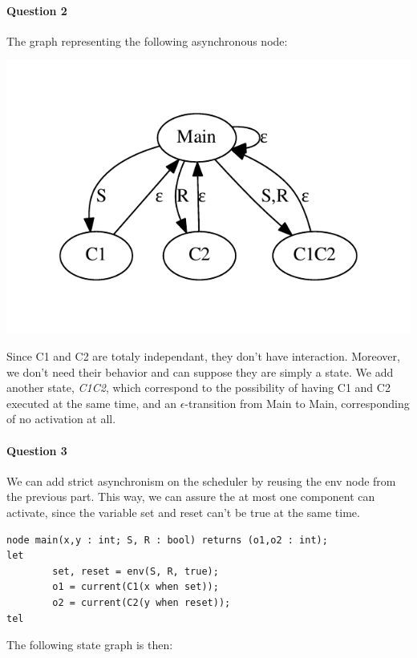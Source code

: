 \documentclass{article}
\begin{document}
\paragraph{Question 2}

The graph representing the following asynchronous node:

\begin{center}
\includegraphics{asyn_1.pdf}
\end{center}

Since C1 and C2 are totaly independant, they don't have interaction. Moreover,
we don't need their behavior and can suppose they are simply a state. We add
another state, \emph{C1C2}, which correspond to the possibility of having C1 and
C2 executed at the same time, and an $\epsilon$-transition from Main to Main,
corresponding of no activation at all.

\paragraph{Question 3}

We can add strict asynchronism on the scheduler by reusing the env node from the
previous part. This way, we can assure the at most one component can activate,
since the variable set and reset can't be true at the same time.

\begin{verbatim}
node main(x,y : int; S, R : bool) returns (o1,o2 : int);
let
        set, reset = env(S, R, true);
        o1 = current(C1(x when set));
        o2 = current(C2(y when reset));
tel
\end{verbatim}

The following state graph is then:
\end{document}
